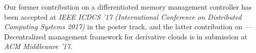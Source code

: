     Our former contribution on a differentiated memory management controller has been accepted at 
    \textit{IEEE ICDCS '17 (International Conference on Distributed Computing Systems 2017)} in the poster track, 
    and the latter contribution on \dd{}---Decentralized management framework for derivative clouds is in
    submission at \textit{ACM Middleware '17}.
    
    